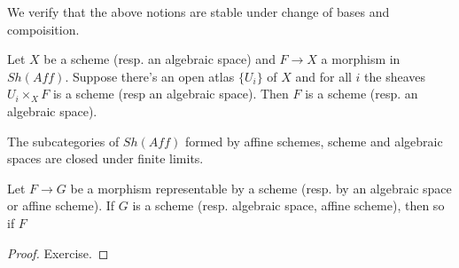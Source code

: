 \documentclass[../main.tex]{subfiles}
\begin{document}
We verify that the above notions are stable under change of bases and compoisition.

\begin{prop}
    \item Let $X$ be a scheme (resp. an algebraic space) and $F \to X$ a morphism in $Sh(Aff)$. Suppose there's an open atlas $\{U_i\}$ of $X$ and for all $i$ the sheaves $U_i \times_XF$ is a scheme (resp an algebraic space). Then $F$ is a scheme (resp. an algebraic space).
    \item The subcategories of $Sh(Aff)$ formed by affine schemes, scheme and algebraic spaces are closed under finite limits.
    \item Let $F \to G$ be a morphism representable by a scheme (resp. by an algebraic space or affine scheme). If $G$ is a scheme (resp. algebraic space, affine scheme), then so if $F$
\end{prop}
\begin{proof}
    Exercise.
\end{proof}
\end{document}
